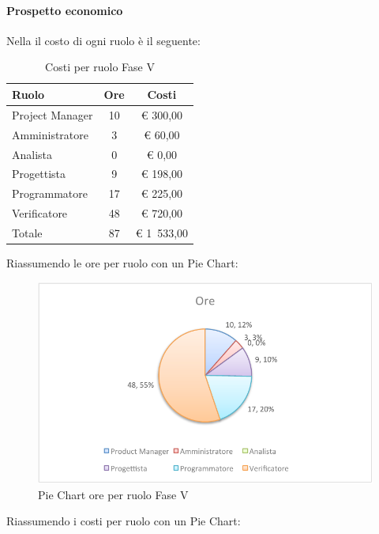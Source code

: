			\paragraph{Prospetto economico}
				Nella  il costo di ogni ruolo è il seguente:
				\begin{table}[H]
					\begin{center}
						\begin{tabular}{| l | c | c |}
							\hline
							Ruolo 			& Ore 	& Costi  \\ \hline
							
							Project Manager	& 10 		& \euro{} 300,00 	\\
							Amministratore 		& 3 		& \euro{} 60,00 	\\
							Analista	 		& 0		& \euro{} 0,00	\\
							Progettista 		& 9 		& \euro{} 198,00  	\\
							Programmatore		& 17 		& \euro{} 225,00 	\\
							Verificatore		& 48 		& \euro{} 720,00 	\\ \hline \hline
							
							Totale	 		& 87 		& \euro{} 1~533,00 	\\ \hline
						\end{tabular}
					\end{center}
					\caption{Costi per ruolo Fase V}
				\end{table}
				Riassumendo le ore per ruolo con un Pie Chart:
				\begin{figure}[H]\centering
					\includegraphics[width=\textwidth]{PianoDiProgetto/Pics/ChartTotOreFaseV.pdf}
					\caption{Pie Chart ore per ruolo Fase V}
				\end{figure}
				Riassumendo i costi per ruolo con un Pie Chart:
